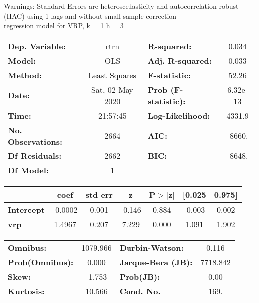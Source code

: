 Warnings: \newline
 [1] Standard Errors are heteroscedasticity and autocorrelation robust (HAC) using 1 lags and without small sample correction\\ 

regression model for VRP, k = 1 h = 3\begin{center}
\begin{tabular}{lclc}
\toprule
\textbf{Dep. Variable:}    &       rtrn       & \textbf{  R-squared:         } &     0.034   \\
\textbf{Model:}            &       OLS        & \textbf{  Adj. R-squared:    } &     0.033   \\
\textbf{Method:}           &  Least Squares   & \textbf{  F-statistic:       } &     52.26   \\
\textbf{Date:}             & Sat, 02 May 2020 & \textbf{  Prob (F-statistic):} &  6.32e-13   \\
\textbf{Time:}             &     21:57:45     & \textbf{  Log-Likelihood:    } &    4331.9   \\
\textbf{No. Observations:} &        2664      & \textbf{  AIC:               } &    -8660.   \\
\textbf{Df Residuals:}     &        2662      & \textbf{  BIC:               } &    -8648.   \\
\textbf{Df Model:}         &           1      & \textbf{                     } &             \\
\bottomrule
\end{tabular}
\begin{tabular}{lcccccc}
                   & \textbf{coef} & \textbf{std err} & \textbf{z} & \textbf{P$> |$z$|$} & \textbf{[0.025} & \textbf{0.975]}  \\
\midrule
\textbf{Intercept} &      -0.0002  &        0.001     &    -0.146  &         0.884        &       -0.003    &        0.002     \\
\textbf{vrp}       &       1.4967  &        0.207     &     7.229  &         0.000        &        1.091    &        1.902     \\
\bottomrule
\end{tabular}
\begin{tabular}{lclc}
\textbf{Omnibus:}       & 1079.966 & \textbf{  Durbin-Watson:     } &    0.116  \\
\textbf{Prob(Omnibus):} &   0.000  & \textbf{  Jarque-Bera (JB):  } & 7718.842  \\
\textbf{Skew:}          &  -1.753  & \textbf{  Prob(JB):          } &     0.00  \\
\textbf{Kurtosis:}      &  10.566  & \textbf{  Cond. No.          } &     169.  \\
\bottomrule
\end{tabular}
\end{center}

